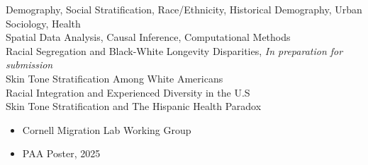 \documentclass[11pt]{article} %
\begin{document}
\large{} Demography, Social Stratification, Race/Ethnicity, Historical Demography, Urban Sociology, Health\\
\large{} Spatial Data Analysis, Causal Inference, Computational Methods \\


Racial Segregation and Black-White Longevity Disparities, \textit{In preparation for submission}  \\

Skin Tone Stratification Among White Americans \\

Racial Integration and Experienced Diversity in the U.S \\

Skin Tone Stratification and The Hispanic Health Paradox
\begin{itemize}
\item  Cornell Migration Lab Working Group
\item PAA Poster, 2025
\end{itemize}
\end{document}
